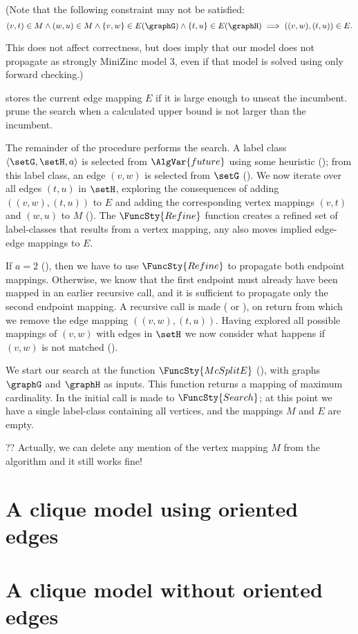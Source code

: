 (Note that the following constraint may not be satisfied:
\[
(v,t) \in M \wedge (w,u) \in M \wedge \{v,w\} \in E(\graphG) \wedge \{t,u\} \in E(\graphH) \implies ((v,w),(t,u)) \in E.
\]

This does not affect correctness, but does imply that our model does not propagate as strongly MiniZinc model 3,
even if that model is solved using only forward checking.)

 stores the current edge mapping $E$ if it is large enough
to unseat the incumbent.   prune the
search when a calculated upper bound is not larger than the incumbent.

The remainder of the procedure performs the search.  A label class $\langle
\setG, \setH, a \rangle$ is selected from $\AlgVar{future}$ using some
heuristic (); from this label class, an edge $(v,w)$ is
selected from $\setG$ (). We now iterate over all edges
$(t,u)$ in $\setH$, exploring the consequences of adding $((v,w),(t,u))$ to $E$
and adding the corresponding vertex mappings $(v,t)$ and $(w,u)$ to $M$
().  The $\FuncSty{Refine}$ function
creates a refined set of label-classes that results from a vertex mapping,
any also moves implied edge-edge mappings to $E$.

If $a=2$ (), then we have to use $\FuncSty{Refine}$ to propagate
both endpoint mappings.  Otherwise, we know that the first endpoint must already have
been mapped in an earlier recursive call, and it is sufficient to propagate only the second
endpoint mapping.  
A recursive call is made ( or ),
on return from which we remove the edge mapping $((v,w),(t,u))$.
Having explored all possible mappings of $(v,w)$ with edges in $\setH$ we now
consider what happens if $(v,w)$ is not matched
().

We start our search at the function $\FuncSty{McSplitE}$ (),
with graphs $\graphG$ and $\graphH$ as inputs.  This function returns a mapping of
maximum cardinality.  In  the initial call is made to
$\FuncSty{Search}$; at this point we have a single label-class containing all
vertices, and the mappings $M$ and $E$ are empty.

?? Actually, we can delete any mention of the vertex mapping $M$ from the algorithm and it still works fine!

\section{A clique model using oriented edges}

\section{A clique model without oriented edges}
